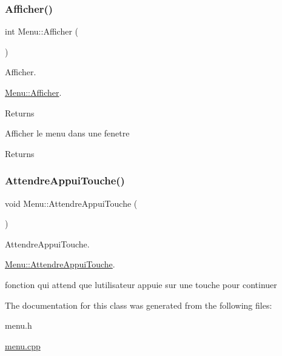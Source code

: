 \subsubsection{\texorpdfstring{Afficher()}{Afficher()}}
{\footnotesize\ttfamily int Menu\+::\+Afficher (\begin{DoxyParamCaption}{ }\end{DoxyParamCaption})}



Afficher. 

\hyperlink{class_menu_a079e0c6a24248a07993b48b310ba65ce}{Menu\+::\+Afficher}.

\begin{DoxyReturn}{Returns}

\end{DoxyReturn}
Afficher le menu dans une fenetre \begin{DoxyReturn}{Returns}

\end{DoxyReturn}
\mbox{\label{class_menu_a6ddcaabf2fedb30f5136f3be655d60ce}} 
\subsubsection{\texorpdfstring{Attendre\+Appui\+Touche()}{AttendreAppuiTouche()}}
{\footnotesize\ttfamily void Menu\+::\+Attendre\+Appui\+Touche (\begin{DoxyParamCaption}{ }\end{DoxyParamCaption})\hspace{0.3cm}{\ttfamily [static]}}



Attendre\+Appui\+Touche. 

\hyperlink{class_menu_a6ddcaabf2fedb30f5136f3be655d60ce}{Menu\+::\+Attendre\+Appui\+Touche}.

fonction qui attend que l\textquotesingle{}utilisateur appuie sur une touche pour continuer 

The documentation for this class was generated from the following files\+:\begin{DoxyCompactItemize}
\item 
menu.\+h\item 
\hyperlink{menu_8cpp}{menu.\+cpp}\end{DoxyCompactItemize}
